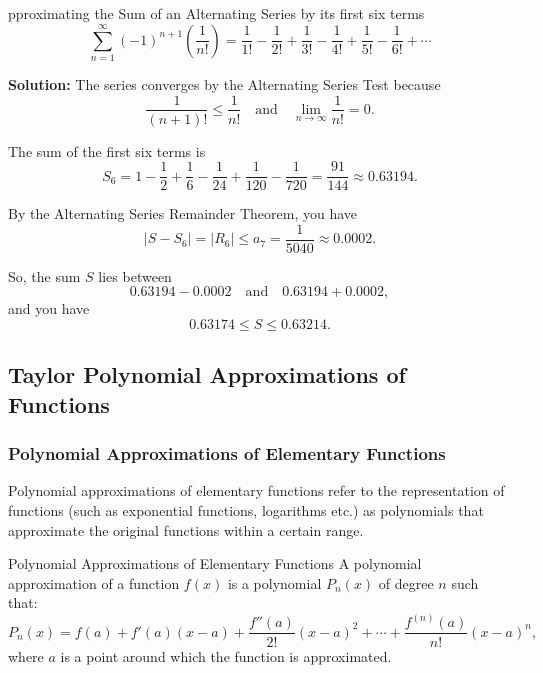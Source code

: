 \documentclass[12pt]{article}
\theoremstyle{beautifulthm}
\begin{document}
\begin{tcolorbox}[colback=examplebg, colframe=red!75!black, title=\textbf{EXAMPLE 3: Approximating the Sum of an Alternating Series}, fonttitle=\bfseries, sharp corners]
pproximating the Sum of an Alternating Series by its first six terms
\[
\sum_{n=1}^\infty (-1)^{n+1} \left( \frac{1}{n!} \right) = \frac{1}{1!} - \frac{1}{2!} + \frac{1}{3!} - \frac{1}{4!} + \frac{1}{5!} - \frac{1}{6!} + \cdots
\]


\tcblower
\textbf{Solution:} 
The series converges by the Alternating Series Test because
\[
\frac{1}{(n+1)!} \leq \frac{1}{n!} \quad \text{and} \quad \lim_{n \to \infty} \frac{1}{n!} = 0.
\]

The sum of the first six terms is
\[
S_6 = 1 - \frac{1}{2} + \frac{1}{6} - \frac{1}{24} + \frac{1}{120} - \frac{1}{720} = \frac{91}{144} \approx 0.63194.
\]

By the Alternating Series Remainder Theorem, you have
\[
|S - S_6| = |R_6| \leq a_7 = \frac{1}{5040} \approx 0.0002.
\]

So, the sum $S$ lies between
\[
0.63194 - 0.0002 \quad \text{and} \quad 0.63194 + 0.0002,
\]
and you have
\[
0.63174 \leq S \leq 0.63214.
\]
\end{tcolorbox}


\newpage
\subsection{Taylor Polynomial
Approximations of Functions}

\subsubsection{Polynomial Approximations of Elementary Functions}
Polynomial approximations of elementary functions refer to the representation of functions (such as exponential functions, logarithms etc.) as polynomials that approximate the original functions within a certain range. 

\begin{Definition}{Polynomial Approximations of Elementary Functions}{}
    A polynomial approximation of a function $f(x)$ is a polynomial $P_n(x)$ of degree $n$ such that:
\[
P_n(x) = f(a) + f'(a)(x-a) + \frac{f''(a)}{2!}(x-a)^2 + \cdots + \frac{f^{(n)}(a)}{n!}(x-a)^n,
\]
where $a$ is a point around which the function is approximated.

\end{Definition}
\end{document}
